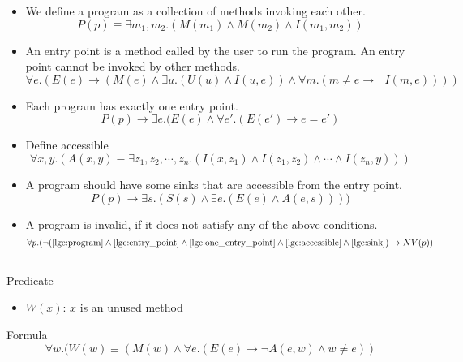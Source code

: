 \documentclass[a4paper]{article}
\begin{document}
\begin{itemize}
	\item
	      We define a program as a collection of methods invoking each other.
	      \begin{equation}
		      \label{lgc:program}
		      P(p) \equiv \exists m_1,m_2.(M(m_1) \land M(m_2) \land I(m_1, m_2))
	      \end{equation}
	\item
	      An entry point is a method called by the user to run the program. An entry
	      point cannot be invoked by other methods.
	      \begin{equation}
		      \label{lgc:entry_point}
		      \forall e.(E(e) \rightarrow (M(e) \land \exists u.(U(u) \land
		      I(u,e)) \land \forall m.(m \neq e \rightarrow \lnot I(m,e))))
	      \end{equation}
	\item
	      Each program has exactly one entry point.
	      \begin{equation}
		      \label{lgc:one_entry_point}
		      P(p) \rightarrow \exists e.(E(e) \land \forall e'.(E(e') \rightarrow e=e')
	      \end{equation}
	\item
	      Define accessible
	      \begin{equation}
		      \label{lgc:accessible}
		      \forall x,y.(A(x,y) \equiv \exists z_1, z_2, \cdots, z_n.(I(x,z_1) \land
		      I(z_1, z_2) \land \cdots \land I(z_n, y)))
	      \end{equation}
	\item
	      A program should have some sinks that are accessible from the entry point.
	      \begin{equation}
		      \label{lgc:sink}
		      P(p) \rightarrow \exists s.(S(s) \land \exists e.(E(e) \land A(e,s))))
	      \end{equation}
	\item
	      A program is invalid, if it does not satisfy any of the above conditions.
	      \begin{equation}
		      \label{lgc:valid}
		      \forall p.(\lnot (\eqref{lgc:program} \land \eqref{lgc:entry_point} \land
		      \eqref{lgc:one_entry_point} \land \eqref{lgc:accessible} \land
		      \eqref{lgc:sink}) \rightarrow NV(p))
	      \end{equation}
\end{itemize}

\subsection{}
Predicate
\begin{itemize}
	\item $W(x)$: $x$ is an unused method
\end{itemize}
Formula
\begin{equation}
	\forall w.(W(w) \equiv (M(w) \land
	\forall e.(E(e) \rightarrow \lnot A(e, w) \land w \neq e))
\end{equation}
\end{document}
